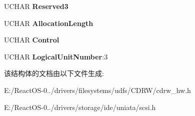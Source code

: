 \begin{DoxyCompactItemize}
\mbox{\label{struct___c_d_b_1_1___m_o_d_e___s_e_n_s_e_a6c0cf6025f3114a6968da4624506c53c}} 
U\+C\+H\+AR {\bfseries Reserved3}
\item 
\mbox{\label{struct___c_d_b_1_1___m_o_d_e___s_e_n_s_e_abd25fba614a4b2d368f860e9066d9db9}} 
U\+C\+H\+AR {\bfseries Allocation\+Length}
\item 
\mbox{\label{struct___c_d_b_1_1___m_o_d_e___s_e_n_s_e_a33bf92e25b082d20660bde7c89e3261c}} 
U\+C\+H\+AR {\bfseries Control}
\item 
\mbox{\label{struct___c_d_b_1_1___m_o_d_e___s_e_n_s_e_a0f736767dcf4914e517e08ca07bfee6f}} 
U\+C\+H\+AR {\bfseries Logical\+Unit\+Number}\+:3
\end{DoxyCompactItemize}


该结构体的文档由以下文件生成\+:\begin{DoxyCompactItemize}
\item 
E\+:/\+React\+O\+S-\/0../drivers/filesystems/udfs/\+C\+D\+R\+W/cdrw\+\_\+hw.\+h\item 
E\+:/\+React\+O\+S-\/0../drivers/storage/ide/uniata/scsi.\+h\end{DoxyCompactItemize}
